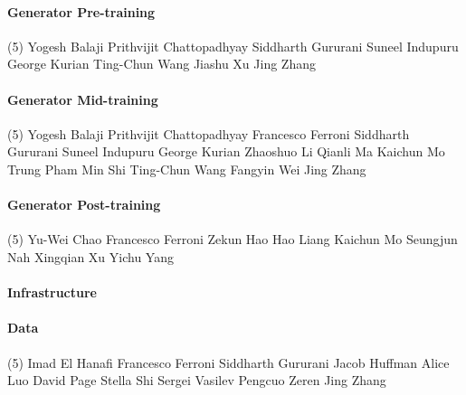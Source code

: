 \vspace{-0.32\baselineskip}\paragraph{\footnotesize Generator Pre-training} \mbox{}
\vspace{-0.32\baselineskip}
\begingroup
\footnotesize
\begin{tasks}[label=\relax, label-width=0pt, item-indent=4pt](5)
\task Yogesh Balaji
\task Prithvijit Chattopadhyay
\task Siddharth Gururani
\task Suneel Indupuru
\task George Kurian
\task Ting-Chun Wang
\task Jiashu Xu
\task Jing Zhang
\end{tasks}
\endgroup

\vspace{-0.32\baselineskip}\paragraph{\footnotesize Generator Mid-training} \mbox{}
\vspace{-0.32\baselineskip}
\begingroup
\footnotesize
\begin{tasks}[label=\relax, label-width=0pt, item-indent=4pt](5)
\task Yogesh Balaji 
\task Prithvijit Chattopadhyay 
\task Francesco Ferroni
\task Siddharth Gururani
\task Suneel Indupuru
\task George Kurian
\task Zhaoshuo Li
\task Qianli Ma
\task Kaichun Mo
\task Trung Pham
\task Min Shi
\task Ting-Chun Wang
\task Fangyin Wei
\task Jing Zhang
\end{tasks}
\endgroup

\vspace{-0.32\baselineskip}\paragraph{\footnotesize Generator Post-training} \mbox{}
\vspace{-0.32\baselineskip}
\begingroup
\footnotesize
\begin{tasks}[label=\relax, label-width=0pt, item-indent=4pt](5)
\task Yu-Wei Chao
\task Francesco Ferroni
\task Zekun Hao
\task Hao Liang
\task Kaichun Mo
\task Seungjun Nah
\task Xingqian Xu
\task Yichu Yang
\end{tasks}
\endgroup

\paragraph{Infrastructure} \mbox{}
\vspace{-0.32\baselineskip}\paragraph{\footnotesize Data} \mbox{}
\vspace{-0.32\baselineskip}
\begingroup
\footnotesize
\begin{tasks}[label=\relax, label-width=0pt, item-indent=4pt](5)
\task Imad El Hanafi
\task Francesco Ferroni
\task Siddharth Gururani 
\task Jacob Huffman
\task Alice Luo
\task David Page
\task Stella Shi
\task Sergei Vasilev
\task Pengcuo Zeren
\task Jing Zhang
\end{tasks}
\endgroup

